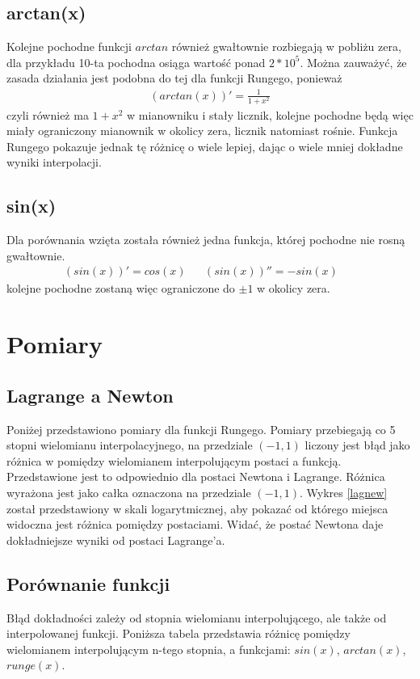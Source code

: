 \documentclass[paper=a4, fontsize=11pt]{scrartcl} %
\numberwithin{equation}{section} %
\numberwithin{figure}{section} %
\numberwithin{table}{section} %
\begin{document}
\subsection{arctan(x)}
Kolejne pochodne funkcji $arctan$ również gwałtownie rozbiegają w pobliżu zera,
dla przykładu 10-ta pochodna osiąga wartość ponad $2*10^5$. Można zauważyć, 
że zasada działania jest podobna do tej dla funkcji Rungego, ponieważ 
\begin{align}
 (arctan(x))' = \frac{1}{1+x^2}
\end{align}
czyli również ma $1+x^2$ w mianowniku i stały licznik, kolejne pochodne będą więc
miały ograniczony mianownik w okolicy zera, licznik natomiast rośnie.
Funkcja Rungego pokazuje jednak tę różnicę o wiele lepiej, dając o wiele mniej
dokładne wyniki interpolacji.

\subsection{sin(x)}
Dla porównania wzięta została również jedna funkcja, której pochodne nie rosną gwałtownie.
\begin{align}
 (sin(x))' = cos(x) &&
 (sin(x))'' = -sin(x) &&
\end{align}
kolejne pochodne zostaną więc ograniczone do $\pm1$ w okolicy zera.

\section{Pomiary}

\subsection{Lagrange a Newton}
Poniżej przedstawiono pomiary dla funkcji Rungego. Pomiary przebiegają
co 5 stopni wielomianu interpolacyjnego, na przedziale $(-1,1)$ liczony jest błąd
jako różnica w pomiędzy wielomianem interpolującym postaci a funkcją.
Przedstawione jest to odpowiednio dla postaci Newtona i Lagrange. 
Różnica wyrażona jest jako całka oznaczona na przedziale $(-1,1)$.
Wykres \ref{lagnew} został przedstawiony w skali logarytmicznej, aby pokazać od którego miejsca
widoczna jest różnica pomiędzy postaciami.
Widać, że postać Newtona daje dokładniejsze wyniki od postaci Lagrange'a.

\subsection{Porównanie funkcji}
Błąd dokładności zależy od stopnia wielomianu interpolującego, ale także od interpolowanej funkcji.
Poniższa tabela przedstawia różnicę pomiędzy wielomianem interpolującym n-tego stopnia, a funkcjami:
$sin(x)$, $arctan(x)$, $runge(x)$.
\end{document}

